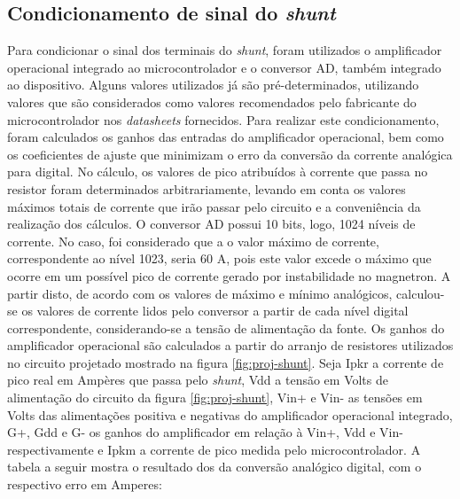 \subsection{Condicionamento de sinal do \textit{shunt}}
Para condicionar o sinal dos terminais do \textit{shunt}, foram utilizados o amplificador operacional integrado ao microcontrolador e o conversor AD, também integrado ao dispositivo. Alguns valores utilizados já são pré-determinados, utilizando valores que são considerados como valores recomendados pelo fabricante do microcontrolador nos \textit{datasheets} fornecidos. Para realizar este condicionamento, foram calculados os ganhos das entradas do amplificador operacional, bem como os coeficientes de ajuste que minimizam o erro da conversão da corrente analógica para digital. No cálculo, os valores de pico atribuídos à corrente que passa no resistor foram determinados arbitrariamente, levando em conta os valores máximos totais de corrente que irão passar pelo circuito e a conveniência da realização dos cálculos. O conversor AD possui 10 bits, logo, 1024 níveis de corrente. No caso, foi considerado que a o valor máximo de corrente, correspondente ao nível 1023, seria 60 A, pois este valor excede o máximo que ocorre em um possível pico de corrente gerado por instabilidade no magnetron. A partir disto, de acordo com os valores de máximo e mínimo analógicos, calculou-se os valores de corrente lidos pelo conversor a partir de cada nível digital correspondente, considerando-se a tensão de alimentação da fonte. Os ganhos do amplificador operacional são calculados a partir do arranjo de resistores utilizados no circuito projetado mostrado na figura \ref{fig:proj-shunt}. Seja Ipkr a corrente de pico real em Ampères que passa pelo \textit{shunt}, Vdd a tensão em Volts de alimentação do circuito da figura \ref{fig:proj-shunt}, Vin+ e Vin- as tensões em Volts das alimentações positiva e negativas do amplificador operacional integrado, G+, Gdd e G- os ganhos do amplificador em relação à Vin+, Vdd e Vin- respectivamente e Ipkm a corrente de pico medida pelo microcontrolador. A tabela a seguir mostra o resultado dos da conversão analógico digital, com o respectivo erro em Amperes:

